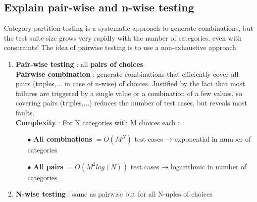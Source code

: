 \documentclass{article}
\begin{document}
\subsection{Explain pair-wise and n-wise testing}
Category-partition testing is a systematic approach to generate combinations, but the test suite
size grows very rapidly with the number of categories, even with constraints! The idea of pairwise
testing is to use a non-exhaustive approach
\begin{enumerate}
    \item \textbf{Pair-wise testing} : all \textbf{pairs of choices}\\
    \textbf{Pairwise combination} : generate combinations that efficiently cover all pairs (triples,... in case of n-wise) of choices. Justified by the fact that most failures are triggered by a single value or a combination of a few values, so covering pairs (triples,...) reduces the number of test cases, but reveals most faults.\\
    \textbf{Complexity} : For N categories with M choices each :
    \begin{itemize}
        \item [$\bullet$]\textbf{All combinations} $= O(M^N)$ test cases → exponential in number of categories
        \item [$\bullet$]\textbf{All pairs} $= O(M^2  log(N))$ test cases → logarithmic in number of categories\\
    \end{itemize}
    
    \item \textbf{N-wise testing} : same as pairwise but for all N-uples of choices
\end{enumerate}

\newpage
\end{document}

